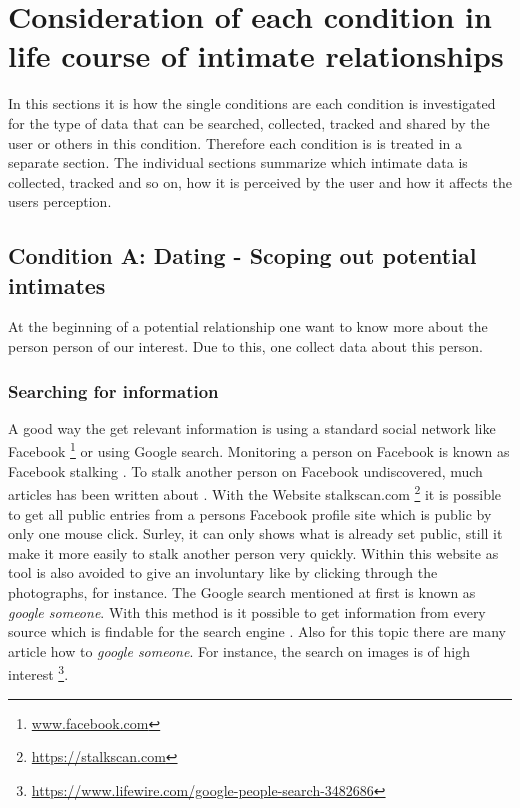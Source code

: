 \section{Consideration of each condition in life course of intimate relationships}
\label{sec:consideration_life_course_conditions}
In this sections it is  how the single conditions are
each condition is investigated for the type of data that can be searched, collected, tracked and shared by the user or others in this condition.
Therefore each condition is is treated in a separate section. The individual sections summarize which intimate data is collected, tracked and so on, how it is perceived by the user and how it affects the users perception.


 
\subsection{Condition A: Dating - Scoping out potential intimates}
\label{subsec:A}
At the beginning of a potential relationship one want to know more about the person person of our interest. Due to this, one collect data about this person. 
\subsubsection{Searching for information}
A good way the get relevant information is using a standard social network like Facebook \footnote{\url{www.facebook.com}} or using Google search. Monitoring a person on Facebook is known as Facebook stalking \cite{levy2014intimate}. To stalk another person on Facebook undiscovered, much articles has been written about \cite{sueddeutsche_fb_stalking}. With the Website stalkscan.com \footnote{\url{https://stalkscan.com}} it is possible to get all public entries from a persons Facebook profile site which is public by only one mouse click. Surley, it can only shows what is already set public, still it make it more easily to stalk another person very quickly.
Within this website as tool is also avoided to give an involuntary like by clicking through the photographs, for instance.
The Google search mentioned at first is known as \textit{google someone}. With this method is it possible to get information from every source which is findable for the search engine \cite{nolan2005hacking}. Also for this topic there are many article how to \textit{google someone}. For instance, the search on images is of high interest \footnote{\url{https://www.lifewire.com/google-people-search-3482686}}.



